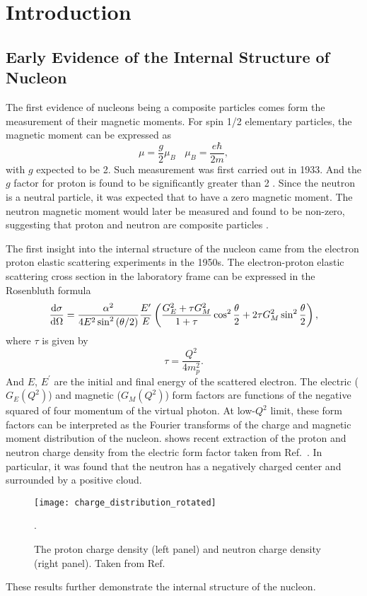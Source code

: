 \documentclass[../main.tex]{subfiles}
\begin{document}
\ifSubfilesClassLoaded{\mainmatter}{}

\chapter{Introduction}
\label{ch:intro}

\section{Early Evidence of the Internal Structure of Nucleon}
The first evidence of nucleons being a composite particles comes form the
measurement of their magnetic moments. For spin 1/2 elementary particles, the
magnetic moment can be expressed as
\begin{equation}
	\mu = \frac{g}{2}\mu_B ~~~~ \mu_B = \frac{e\hbar}{2m},
\end{equation}
with $g$ expected to be \num{2}. Such measurement was first carried out in 1933.
And the $g$ factor for proton is found to be  significantly greater than \num{2}
\cite{frisch1933}. Since the neutron is a neutral particle, it was expected that
to have a zero magnetic moment. The neutron magnetic moment would later be
measured and found to be non-zero, suggesting that proton and neutron are
composite particles \cite{rabi1934a}.

The first insight into the internal structure of the nucleon came from the 
electron proton elastic scattering experiments \cite{hofstadter1956} in the
1950s. The electron-proton elastic scattering cross section in the laboratory
frame can be expressed in the Rosenbluth formula \cite{rosenbluth1950}
\begin{equation}
	\dv{\sigma}{\Omega} = \frac{\alpha^2}{4E^2 \sin^2\left(\theta/2\right)}
	\frac{E^\prime}{E} \left( \frac{G_E^2+\tau G_M^2}{1+\tau} \cos^2
	\frac{\theta}{2} + 2\tau G_M^2 \sin^2 \frac{\theta}{2}\right)
	\label{eq:ep_cs},
\end{equation}
where $\tau$ is given by
\begin{equation}
	\tau = \frac{Q^2}{4m_p^2}.
\end{equation}
And $E$, $E^\prime$ are the initial and final energy of the scattered electron.
The electric ($G_E\left(Q^2\right)$) and magnetic ($G_M\left(Q^2\right)$) form
factors are functions of the negative squared of four momentum of the virtual photon. At
low-$Q^2$ limit, these form factors can be interpreted as the Fourier transforms
of the charge and magnetic moment distribution of the nucleon. 
shows recent extraction of the proton and neutron charge density from the electric
form factor taken from Ref.~\cite{miller2007}. In particular, it was found that
the neutron has a negatively charged center and surrounded by a positive cloud.
\begin{figure}[htbp!]
	\centering
	\texttt{[image: charge\_distribution\_rotated]}
	\caption{The proton charge density (left panel) and neutron charge density
		(right panel). Taken from Ref.~\cite{miller2007}}.
	\label{fig:charge}
\end{figure}
These results further demonstrate the internal structure of the nucleon.
\end{document}

